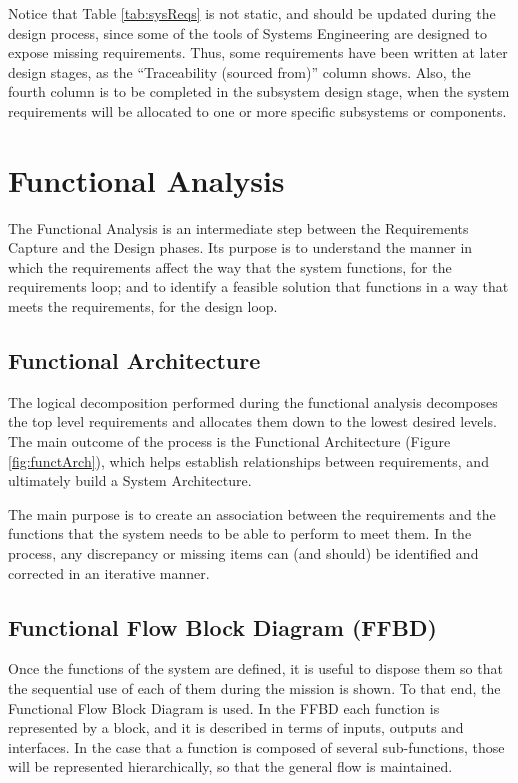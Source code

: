 

Notice that Table \ref{tab:sysReqs} is not static, and should be updated during the design process, since some of the tools of Systems Engineering are designed to expose missing requirements.
Thus, some requirements have been written at later design stages, as the ``Traceability (sourced from)'' column shows.
Also, the fourth column is to be completed in the subsystem design stage, when the system requirements will be allocated to one or more specific subsystems or components.


\section{Functional Analysis}

The Functional Analysis is an intermediate step between the Requirements Capture and the Design phases.
Its purpose is to understand the manner in which the requirements affect the way that the system functions, for the requirements loop; and to identify a feasible solution that functions in a way that meets the requirements, for the design loop.

\subsection{Functional Architecture}

The logical decomposition performed during the functional analysis decomposes the top level requirements and allocates them down to the lowest desired levels.
The main outcome of the process is the Functional Architecture (Figure \ref{fig:functArch}), which helps establish relationships between requirements, and ultimately build a System Architecture.



The main purpose is to create an association between the requirements and the functions that the system needs to be able to perform to meet them.
In the process, any discrepancy or missing items can (and should) be identified and corrected in an iterative manner.

\subsection{Functional Flow Block Diagram (FFBD)}

Once the functions of the system are defined, it is useful to dispose them so that the sequential use of each of them during the mission is shown.
To that end, the Functional Flow Block Diagram is used.
In the FFBD each function is represented by a block, and it is described in terms of inputs, outputs and interfaces.
In the case that a function is composed of several sub-functions, those will be represented hierarchically, so that the general flow is maintained.

